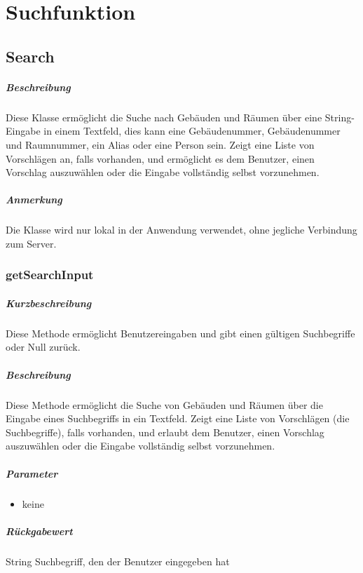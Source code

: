 \chapter{Suchfunktion}

\section{Search}
\paragraph*{Beschreibung}
Diese Klasse ermöglicht die Suche nach Gebäuden und Räumen über eine String-Eingabe in einem Textfeld, 
dies kann eine Gebäudenummer, Gebäudenummer und Raumnummer, ein Alias oder eine Person sein.
Zeigt eine Liste von Vorschlägen an, falls vorhanden, und ermöglicht es dem Benutzer, einen Vorschlag auszuwählen oder die Eingabe vollständig selbst vorzunehmen.
\paragraph*{Anmerkung}
Die Klasse wird nur lokal in der Anwendung verwendet, ohne jegliche Verbindung zum Server.

\subsection{getSearchInput}%
\paragraph*{Kurzbeschreibung}
Diese Methode ermöglicht Benutzereingaben und gibt einen gültigen Suchbegriffe oder Null zurück.
\paragraph*{Beschreibung}
Diese Methode ermöglicht die Suche von Gebäuden und Räumen über die Eingabe eines Suchbegriffs in ein Textfeld.
Zeigt eine Liste von Vorschlägen (die Suchbegriffe), falls vorhanden, und erlaubt dem Benutzer, einen Vorschlag auszuwählen oder die Eingabe vollständig selbst vorzunehmen.
\paragraph*{Parameter}
\begin{itemize}
    \item keine
\end{itemize}
\paragraph*{Rückgabewert}
String Suchbegriff, den der Benutzer eingegeben hat
